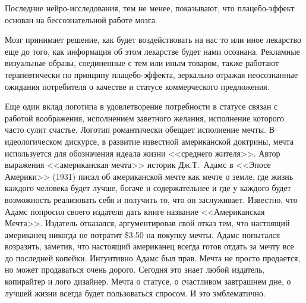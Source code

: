 Последние нейро-исследования, тем не менее, показывают, что плацебо-эффект
основан на бессознательной работе
мозга.\autocite{jensen2012nonconscious}

Мозг принимает решение, как будет воздействовать на нас то или иное лекарство
еще до того, как информация об этом лекарстве будет нами осознана. Рекламные
визуальные образы, соединенные с тем или иным товаром, также работают
терапевтически по принципу плацебо-эффекта, зеркально отражая неосознанные
ожидания потребителя о качестве и статусе коммерческого
предложения.\autocite{ariely2009predictably}

Еще один вклад логотипа в удовлетворение потребности в статусе связан с работой
воображения, исполнением заветного желания, исполнение которого часто сулит
счастье. Логотип романтически обещает исполнение мечты. В идеологическом
дискурсе, в развитие известной американской доктрины, мечта используется для
обозначения идеала жизни <<среднего жителя>>. Автор выражения <<американская
мечта>> историк Дж.Т.~Адамс в <<Эпосе Америки>> (1931) писал об американской
мечте как мечте о земле, где жизнь каждого человека будет лучше, богаче и
содержательнее и где у каждого будет возможность реализовать себя и получить
то, что он
заслуживает.\autocite{adams1938epic} Известно, что Адамс попросил своего
издателя дать книге название <<Американская Мечта>>. Издатель отказался,
аргументировав свой отказ тем, что настоящий американец никогда не потратит \$3.50
на покупку мечты. Адамс попытался возразить, заметив, что настоящий американец
всегда готов отдать за мечту все до последней копейки. Интуитивно Адамс был прав.
Мечта не просто продается, но может продаваться очень дорого. Сегодня это знает
любой издатель, копирайтер и лого дизайнер. Мечта о статусе, о счастливом
завтрашнем дне, о лучшей жизни всегда будет пользоваться спросом. И это
эмблематично.

